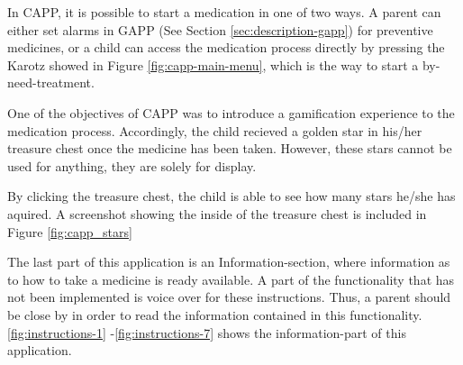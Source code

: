 In CAPP, it is possible to start a medication in one of two ways. A parent can either set alarms in GAPP (See Section \ref{sec:description-gapp}) for preventive medicines, or a child can access the medication process directly by pressing the Karotz showed in Figure \ref{fig:capp-main-menu}, which is the way to start a by-need-treatment. 


One of the objectives of CAPP was to introduce a gamification experience to the medication process. Accordingly, the child recieved a golden star in his/her treasure chest once the medicine has been taken. However, these stars cannot be used for anything, they are solely for display.
  

By clicking the treasure chest, the child is able to see how many stars he/she has aquired. A screenshot showing the inside of the treasure chest is included in Figure \ref{fig:capp_stars} 


The last part of this application is an Information-section, where information as to how to take a medicine is ready available. A part of the functionality that has not been implemented is voice over for these instructions. Thus, a parent should be close by in order to read the information contained in this functionality.     
\ref{fig:instructions-1} -\ref{fig:instructions-7} shows the information-part of this application.



